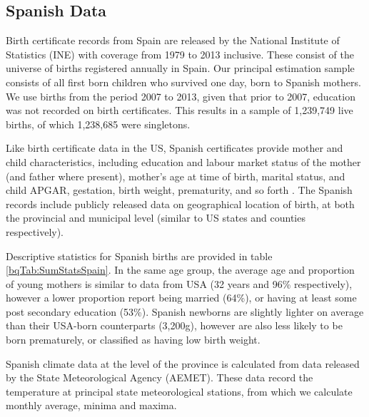 \documentclass[a4paper, 12 pt]{article}
\theoremstyle{plain}
\begin{document}
\begin{doublespace}
\subsection{Spanish Data}

Birth certificate records from Spain are released by the National Institute of Statistics (INE)
with coverage from 1979 to 2013 inclusive. These consist of the universe of
births registered annually in Spain. Our principal estimation sample consists of
all first born children who survived one day, born to Spanish mothers. We use
births from the period 2007 to 2013, given that prior to 2007, education was not
recorded on birth certificates.  This results in a sample of 1,239,749 live
births, of which 1,238,685 were singletons.

Like birth certificate data in the US, Spanish certificates provide mother
and child characteristics, including education and labour market status of the
mother (and father where present), mother's age at time of birth, marital
status, and child APGAR, gestation, birth weight, prematurity, and so forth
\citep{INE2013}.  The Spanish records include publicly released data on
geographical location of birth, at both the provincial and municipal level
(similar to US states and counties respectively).

Descriptive statistics for Spanish births are provided in table \ref{bqTab:SumStatsSpain}.  In the same
age group, the average age and proportion of young mothers is similar to data
from USA (32 years and 96\% respectively), however a lower proportion report
being married (64\%), or having at least some post secondary education (53\%).
Spanish newborns are slightly lighter on average than their USA-born
counterparts (3,200g), however are also less likely to be born prematurely,
or classified as having low birth weight.

Spanish climate data at the level of the province is calculated from data released by the State Meteorological
Agency (AEMET). These data record the temperature at principal state
meteorological stations, from which we calculate monthly average, minima and
maxima.






\end{doublespace}
\end{document}

